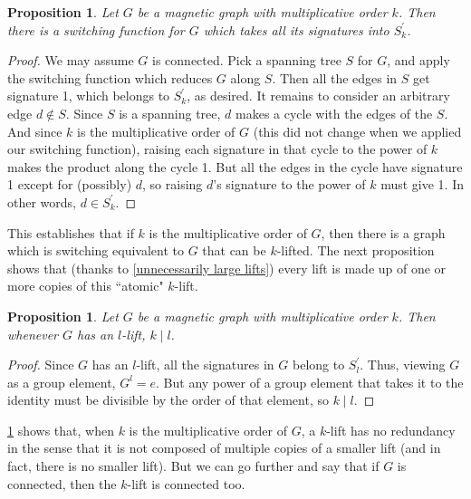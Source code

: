 \documentclass[12pt]{article}
\newtheorem{prop}[thm]{Proposition}
\theoremstyle{definition}
\begin{document}
\begin{prop}
Let $G$ be a magnetic graph with multiplicative order $k$. Then there is a switching function for $G$ which takes all its signatures into $S^\prime_k$.
\end{prop}
\begin{proof}
We may assume $G$ is connected. Pick a spanning tree $S$ for $G$, and apply the switching function which reduces $G$ along $S$. Then all the edges in $S$ get signature 1, which belongs to $S^\prime_k$, as desired. It remains to consider an arbitrary edge $d \notin S$. Since $S$ is a spanning tree, $d$ makes a cycle with the edges of the $S$. And since $k$ is the multiplicative order of $G$ (this did not change when we applied our switching function), raising each signature in that cycle to the power of $k$ makes the product along the cycle 1. But all the edges in the cycle have signature 1 except for (possibly) $d$, so raising $d$'s signature to the power of $k$ must give 1. In other words, $d \in S^\prime_k$.
\end{proof}

This establishes that if $k$ is the multiplicative order of $G$, then there is a graph which is switching equivalent to $G$ that can be $k$-lifted. The next proposition shows that (thanks to \cref{unnecessarily large lifts}) every lift is made up of one or more copies of this ``atomic" $k$-lift.

\begin{prop}\label{multiplicative order divides all lift sizes}
Let $G$ be a magnetic graph with multiplicative order $k$. Then whenever $G$ has an $l$-lift, $k \mid l$.
\end{prop}
\begin{proof}
Since $G$ has an $l$-lift, all the signatures in $G$ belong to $S^\prime_l$. Thus, viewing $G$ as a group element, $G^l=e$. But any power of a group element that takes it to the identity must be divisible by the order of that element, so $k \mid l$.
\end{proof}

\cref{multiplicative order divides all lift sizes} shows that, when $k$ is the multiplicative order of $G$, a $k$-lift has no redundancy in the sense that it is not composed of multiple copies of a smaller lift (and in fact, there is no smaller lift). But we can go further and say that if $G$ is connected, then the $k$-lift is connected too.
\end{document}
